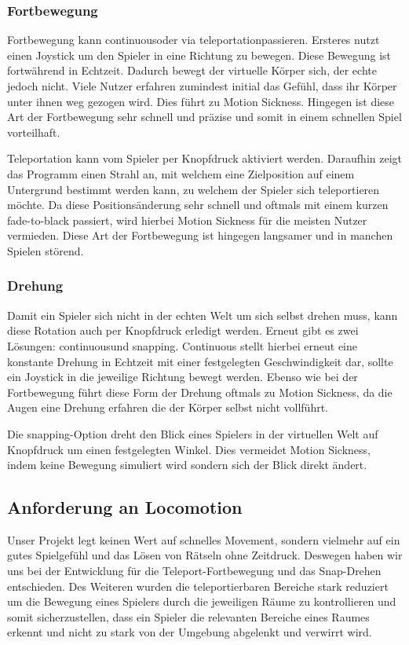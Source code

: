 \subsubsection{Fortbewegung}
Fortbewegung kann \dq continuous\dq oder via \dq teleportation\dq passieren. Ersteres nutzt einen Joystick um den Spieler in eine Richtung zu bewegen. Diese Bewegung ist fortwährend in Echtzeit. Dadurch bewegt der virtuelle Körper sich, der echte jedoch nicht. Viele Nutzer erfahren zumindest initial das Gefühl, dass ihr Körper unter ihnen weg gezogen wird. Dies führt zu Motion Sickness. Hingegen ist diese Art der Fortbewegung sehr schnell und präzise und somit in einem schnellen Spiel vorteilhaft.

Teleportation kann vom Spieler per Knopfdruck aktiviert werden. Daraufhin zeigt das Programm einen Strahl an, mit welchem eine Zielposition auf einem Untergrund bestimmt werden kann, zu welchem der Spieler sich teleportieren möchte. Da diese Positionsänderung sehr schnell und oftmals mit einem kurzen fade-to-black passiert, wird hierbei Motion Sickness für die meisten Nutzer vermieden. Diese Art der Fortbewegung ist hingegen langsamer und in manchen Spielen störend.

\subsubsection{Drehung}
Damit ein Spieler sich nicht in der echten Welt um sich selbst drehen muss, kann diese Rotation auch per Knopfdruck erledigt werden. Erneut gibt es zwei Lösungen: \dq continuous\dq und \dq snapping\dq. Continuous stellt hierbei erneut eine konstante Drehung in Echtzeit mit einer festgelegten Geschwindigkeit dar, sollte ein Joystick in die jeweilige Richtung bewegt werden. Ebenso wie bei der Fortbewegung führt diese Form der Drehung oftmals zu Motion Sickness, da die Augen eine Drehung erfahren die der Körper selbst nicht vollführt.

Die snapping-Option dreht den Blick eines Spielers in der virtuellen Welt auf Knopfdruck um einen festgelegten Winkel. Dies vermeidet Motion Sickness, indem keine Bewegung simuliert wird sondern sich der Blick direkt ändert.


\subsection{Anforderung an Locomotion}
Unser Projekt legt keinen Wert auf schnelles Movement, sondern vielmehr auf ein gutes Spielgefühl und das Lösen von Rätseln ohne Zeitdruck. Deswegen haben wir uns bei der Entwicklung für die Teleport-Fortbewegung und das Snap-Drehen entschieden. Des Weiteren wurden die teleportierbaren Bereiche stark reduziert um die Bewegung eines Spielers durch die jeweiligen Räume zu kontrollieren und somit sicherzustellen, dass ein Spieler die relevanten Bereiche eines Raumes erkennt und nicht zu stark von der Umgebung abgelenkt und verwirrt wird.
